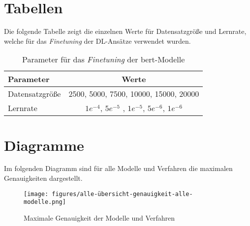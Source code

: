\section{Tabellen}

Die folgende Tabelle zeigt die einzelnen Werte für Datensatzgröße und Lernrate, welche für das \textit{Finetuning} der DL-Ansätze verwendet wurden.

\begin{table}[h]
    \center
    \begin{tabular}{lc}
        \toprule
        Parameter       & Werte                                                   \\
        \midrule
        Datensatzgröße  & 2500, 5000, 7500, 10000, 15000, 20000                   \\
        Lernrate        & $1e^{-4}$, $5e^{-5}$ , $1e^{-5}$, $5e^{-6}$, $1e^{-6}$  \\
        \bottomrule
    \end{tabular}
    \caption{Parameter für das \textit{Finetuning} der \gls{bert}-Modelle}
    \label{tab:dl-params}
\end{table}

\section{Diagramme}

Im folgenden Diagramm sind für alle Modelle und Verfahren die maximalen Genauigkeiten dargestellt.

\begin{figure}[H]
    \centering
    \texttt{[image: figures/alle-übersicht-genauigkeit-alle-modelle.png]}
    \caption{Maximale Genauigkeit der Modelle und Verfahren}
    \label{fig:results}
\end{figure}

